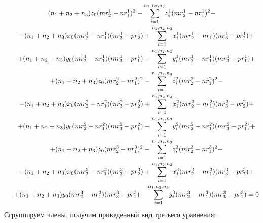 $$\begin{gathered}
	(n_1 + n_2 + n_3) z_0 (m r_2^1 - n r_1^1)^2 - \underset{i=1}{\overset{n_1, n_2, n_3}{\sum}} z_i^1 (m r_2^1 - n r_1^1)^2 - \\
	\hspace{0.5cm} - (n_1 + n_2 + n_3) x_0 (m r_2^1 - n r_1^1) (n r_3^1 - p r_2^1) + \underset{i=1}{\overset{n_1, n_2, n_3}{\sum}} x_i^1 (m r_2^1 - n r_1^1) (n r_3^1 - p r_2^1) + \\
	\hspace{0.5cm} + (n_1 + n_2 + n_3) y_0 (m r_2^1 - n r_1^1) (m r_3^1 - p r_1^1) - \underset{i=1}{\overset{n_1, n_2, n_3}{\sum}} y_i^1  (m r_2^1 - n r_1^1) (m r_3^1 - p r_1^1) + \\
	\hspace{0.5cm} + (n_1 + n_2 + n_3) z_0 (m r_2^2 - n r_1^2)^2 - \underset{i=1}{\overset{n_1, n_2, n_3}{\sum}} z_i^2 (m r_2^2 - n r_1^2)^2 - \\
	\hspace{0.5cm} - (n_1 + n_2 + n_3) x_0 (m r_2^2 - n r_1^2) (n r_3^2 - p r_2^2) + \underset{i=1}{\overset{n_1, n_2, n_3}{\sum}} x_i^2  (m r_2^2 - n r_1^2) (n r_3^2 - p r_2^2) + \\
	\hspace{0.5cm} + (n_1 + n_2 + n_3) y_0 (m r_2^2 - n r_1^2) (m r_3^2 - p r_1^2) - \underset{i=1}{\overset{n_1, n_2, n_3}{\sum}} y_i^2 (m r_2^2 - n r_1^2) (m r_3^2 - p r_1^2) + \\
	\hspace{0.5cm} + (n_1 + n_2 + n_3) z_0 (m r_2^3 - n r_1^3)^2 - \underset{i=1}{\overset{n_1, n_2, n_3}{\sum}} z_i^3 (m r_2^3 - n r_1^3)^2 - \\
	\hspace{0.5cm} - (n_1 + n_2 + n_3) x_0 (m r_2^3 - n r_1^3) (n r_3^3 - p r_2^3) + \underset{i=1}{\overset{n_1, n_2, n_3}{\sum}} x_i^3 (m r_2^3 - n r_1^3) (n r_3^3 - p r_2^3) + \\
	\hspace{0.5cm} + (n_1 + n_2 + n_3) y_0 (m r_2^3 - n r_1^3) (m r_3^3 - p r_1^3) - \underset{i=1}{\overset{n_1, n_2, n_3}{\sum}} y_i^3 (m r_2^3 - n r_1^3) (m r_3^3 - p r_1^3) = 0
\end{gathered}$$
Сгруппируем члены, получим приведенный вид третьего уравнения:
